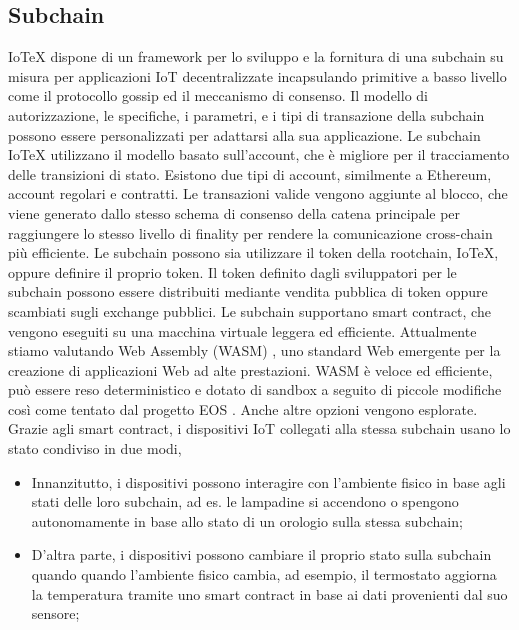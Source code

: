 \subsection{Subchain}
IoTeX dispone di un framework per lo sviluppo e la fornitura di una subchain su misura
per applicazioni IoT decentralizzate incapsulando primitive a basso livello come il protocollo gossip
ed il meccanismo di consenso. Il modello di autorizzazione, le specifiche, i parametri,
e i tipi di transazione della subchain possono essere personalizzati per adattarsi alla sua applicazione.
Le subchain IoTeX utilizzano il modello basato sull'account, che è migliore per il tracciamento delle transizioni di stato.
Esistono due tipi di account, similmente a Ethereum, account regolari e
contratti. Le transazioni valide vengono aggiunte al blocco, che viene generato dallo stesso
schema di consenso della catena principale per raggiungere lo stesso livello di finality per rendere la comunicazione cross-chain più efficiente. Le subchain possono sia utilizzare il token della rootchain, IoTeX, oppure definire il proprio token. Il token definito dagli sviluppatori per le subchain possono essere distribuiti mediante vendita pubblica di token oppure scambiati sugli exchange pubblici.
Le subchain supportano smart contract, che vengono eseguiti su una macchina virtuale leggera ed efficiente. Attualmente stiamo valutando Web Assembly (WASM) \cite{c36}, uno standard Web emergente per la creazione di applicazioni Web ad alte prestazioni. WASM è veloce ed efficiente, può essere reso deterministico e dotato di sandbox a seguito di piccole modifiche così come tentato dal progetto EOS \cite{c9}. Anche altre opzioni vengono esplorate. Grazie agli smart contract, i dispositivi IoT collegati alla stessa subchain usano lo stato condiviso in due modi,

\begin{itemize}
	\item Innanzitutto, i dispositivi possono interagire con l'ambiente fisico in base agli stati delle loro subchain, ad es. le lampadine si accendono o spengono autonomamente in base allo stato di un orologio sulla stessa subchain;

	\item D'altra parte, i dispositivi possono cambiare il proprio stato sulla subchain quando
	      quando l'ambiente fisico cambia, ad esempio, il termostato aggiorna la temperatura tramite uno smart contract in base ai dati provenienti dal suo sensore;
\end{itemize}

